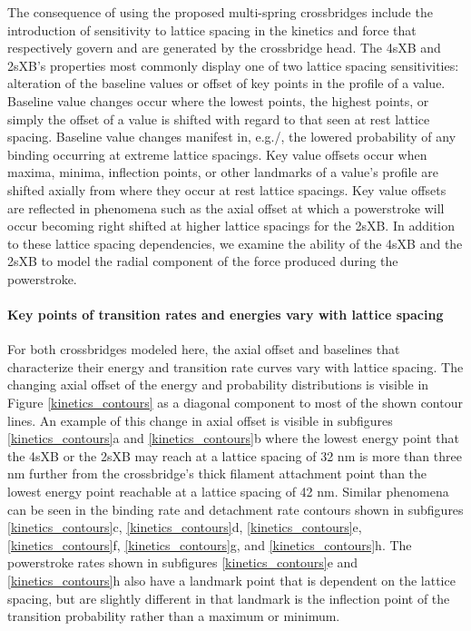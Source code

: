 \documentclass[]{article}
\begin{document}
The consequence of using the proposed multi-spring crossbridges include the introduction of sensitivity to lattice spacing in the kinetics and force that respectively govern and are generated by the crossbridge head. 
The 4sXB and 2sXB's properties most commonly display one of two lattice spacing sensitivities: alteration of the baseline values or offset of key points in the profile of a value.
Baseline value changes occur where the lowest points, the highest points, or simply the offset of a value is shifted with regard to that seen at rest lattice spacing.
Baseline value changes manifest in, e.g./, the lowered probability of any binding occurring at extreme lattice spacings. 
Key value offsets occur when maxima, minima, inflection points, or other landmarks of a value's profile are shifted axially from where they occur at rest lattice spacings.
Key value offsets are reflected in phenomena such as the axial offset at which a powerstroke will occur becoming right shifted at higher lattice spacings for the 2sXB.
In addition to these lattice spacing dependencies, we examine the ability of the 4sXB and the 2sXB to model the radial component of the force produced during the powerstroke.

\paragraph{Key points of transition rates and energies vary with lattice spacing} %
For both crossbridges modeled here, the axial offset and baselines that characterize their energy and transition rate curves vary with lattice spacing.
The changing axial offset of the energy and probability distributions is visible in Figure \ref{kinetics_contours} as a diagonal component to most of the shown contour lines. 
An example of this change in axial offset is visible in subfigures \ref{kinetics_contours}a and \ref{kinetics_contours}b where the lowest energy point that the 4sXB or the 2sXB may reach at a lattice spacing of 32 nm is more than three nm further from the crossbridge's thick filament attachment point than the lowest energy point reachable at a lattice spacing of 42 nm.
Similar phenomena can be seen in the binding rate and detachment rate contours shown in subfigures \ref{kinetics_contours}c, \ref{kinetics_contours}d, \ref{kinetics_contours}e, \ref{kinetics_contours}f, \ref{kinetics_contours}g, and \ref{kinetics_contours}h. 
The powerstroke rates shown in subfigures \ref{kinetics_contours}e and \ref{kinetics_contours}h also have a landmark point that is dependent on the lattice spacing, but are slightly different in that landmark is the inflection point of the transition probability rather than a maximum or minimum.
\end{document}
